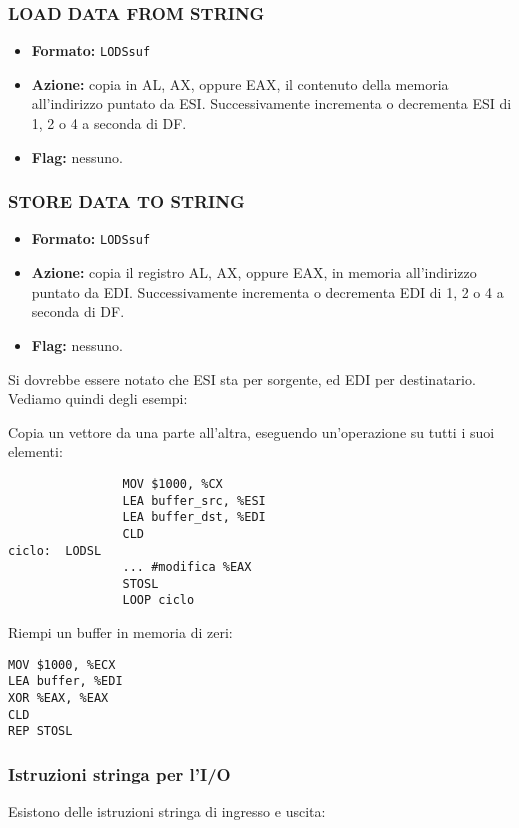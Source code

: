 \documentclass[a4paper,11pt]{article}
\begin{document}
\subsubsection{LOAD DATA FROM STRING}
\begin{itemize}
	\item \textbf{Formato:} \lstinline|LODSsuf| 
	\item \textbf{Azione:} copia in AL, AX, oppure EAX, il contenuto della memoria all'indirizzo puntato da ESI. Successivamente incrementa o decrementa ESI di 1, 2 o 4 a seconda di DF.
	\item \textbf{Flag:} nessuno.
\end{itemize}

\subsubsection{STORE DATA TO STRING}
\begin{itemize}
	\item \textbf{Formato:} \lstinline|LODSsuf| 
	\item \textbf{Azione:} copia il registro AL, AX, oppure EAX, in memoria all'indirizzo puntato da EDI. Successivamente incrementa o decrementa EDI di 1, 2 o 4 a seconda di DF.
	\item \textbf{Flag:} nessuno.
\end{itemize}

Si dovrebbe essere notato che ESI sta per sorgente, ed EDI per destinatario.
Vediamo quindi degli esempi:
\par\smallskip
\begin{minipage}[t]{0.45\textwidth}
Copia un vettore da una parte all'altra, eseguendo un'operazione su tutti i suoi elementi:
\begin{lstlisting}	
				MOV $1000, %CX
				LEA buffer_src, %ESI
				LEA buffer_dst, %EDI
				CLD
ciclo:	LODSL
				...	#modifica %EAX
				STOSL
				LOOP ciclo
\end{lstlisting}

\end{minipage}%
\hfill %
\begin{minipage}[t]{0.45\textwidth}
Riempi un buffer in memoria di zeri:
\begin{lstlisting}	
MOV $1000, %ECX
LEA buffer, %EDI
XOR %EAX, %EAX
CLD
REP STOSL
\end{lstlisting}
\end{minipage}

\subsubsection{Istruzioni stringa per l'I/O}
Esistono delle istruzioni stringa di ingresso e uscita: 
\end{document}
